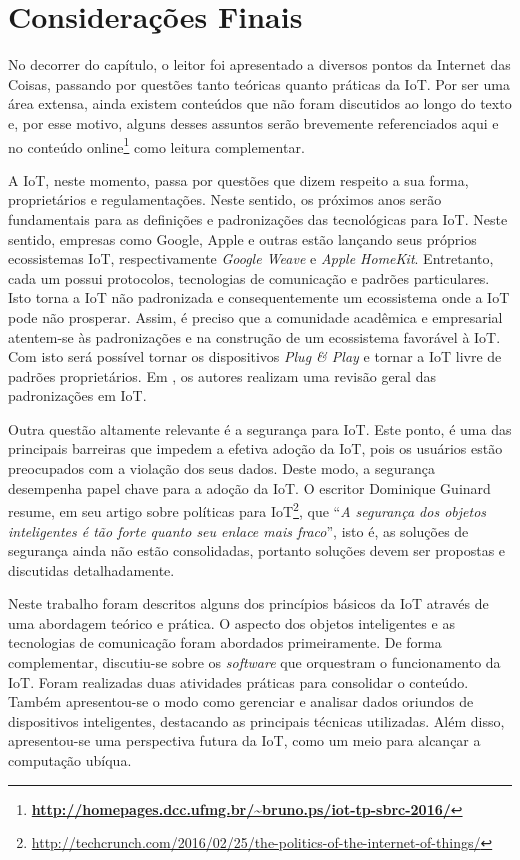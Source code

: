 
\section{Considerações Finais}  
\label{sec:CF}

No decorrer do capítulo, o leitor foi apresentado a diversos pontos da Internet das Coisas, passando por questões tanto teóricas quanto práticas da IoT. Por ser uma área extensa, ainda existem conteúdos que não foram discutidos ao longo do texto e, por esse motivo, alguns desses assuntos serão brevemente referenciados aqui e no conteúdo online\footnote{\scriptsize 
\textbf{\url{ 
http://homepages.dcc.ufmg.br/~bruno.ps/iot-tp-sbrc-2016/}}} como leitura complementar.

A IoT, neste momento, passa por questões que dizem respeito a sua forma, proprietários e regulamentações. Neste sentido, os próximos anos serão fundamentais para as definições e padronizações das tecnológicas para IoT. Neste sentido, empresas como Google, Apple e outras estão lançando seus próprios ecossistemas IoT, respectivamente \textit{Google Weave }e \textit{Apple HomeKit}. Entretanto, cada um possui protocolos, tecnologias de comunicação e padrões particulares. Isto torna a IoT não padronizada e consequentemente um ecossistema onde a IoT pode não prosperar. Assim, é preciso que a comunidade acadêmica e empresarial atentem-se às padronizações e na construção de um ecossistema favorável à IoT. Com isto será possível tornar os dispositivos \textit{Plug \& Play} e tornar a IoT livre de padrões proprietários. Em \cite{ishaq2013ietf}, os autores realizam uma revisão geral das padronizações em IoT.

Outra questão altamente relevante é a segurança para IoT. Este ponto, é uma das principais barreiras que impedem a efetiva adoção da IoT, pois os usuários estão preocupados com a violação dos seus dados. Deste modo, a segurança desempenha papel chave para a adoção da IoT. O escritor  Dominique Guinard resume, em seu artigo sobre políticas para IoT\footnote{\url{http://techcrunch.com/2016/02/25/the-politics-of-the-internet-of-things/}}, que ``\textit{A segurança dos objetos inteligentes é tão forte quanto seu enlace mais fraco}'', isto é, as soluções de segurança ainda não estão consolidadas, portanto soluções devem ser propostas e discutidas detalhadamente.

Neste trabalho foram descritos alguns dos princípios básicos da IoT através de uma abordagem teórico e prática. O aspecto dos objetos inteligentes e as tecnologias de comunicação foram abordados primeiramente. De forma complementar, discutiu-se sobre os \textit{software} que orquestram o funcionamento da IoT.  Foram realizadas duas atividades práticas para consolidar o conteúdo. Também apresentou-se o modo como gerenciar e analisar dados oriundos de dispositivos inteligentes, destacando as principais técnicas utilizadas. Além disso, apresentou-se uma perspectiva futura da IoT, como um meio para alcançar a computação ubíqua.

